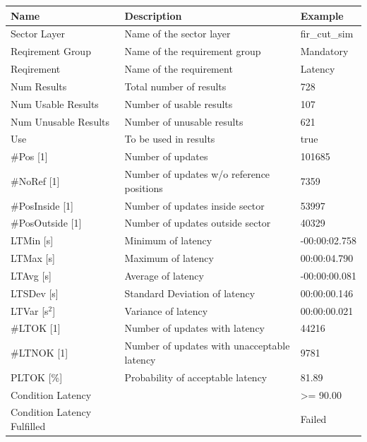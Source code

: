 \begin{center}
 \begin{table}[H]
  \begin{tabularx}{\textwidth}{ | l | X |  l | }
    \hline
    \textbf{Name} & \textbf{Description} & \textbf{Example} \\ \hline
    Sector Layer & Name of the sector layer & fir\_cut\_sim \\ \hline
    Reqirement Group & Name of the requirement group & Mandatory \\ \hline
    Reqirement & Name of the requirement & Latency \\ \hline
    Num Results & Total number of results & 728 \\ \hline
    Num Usable Results & Number of usable results & 107 \\ \hline
    Num Unusable Results & Number of unusable results & 621 \\ \hline
    Use & To be used in results & true \\ \hline
    \#Pos [1] & Number of updates & 101685 \\ \hline
    \#NoRef [1] & Number of updates w/o reference positions & 7359 \\ \hline
    \#PosInside [1] & Number of updates inside sector & 53997 \\ \hline
    \#PosOutside [1] & Number of updates outside sector & 40329 \\ \hline
    LTMin [s] & Minimum of latency & -00:00:02.758 \\ \hline
    LTMax [s] & Maximum of latency & 00:00:04.790 \\ \hline
    LTAvg [s] & Average of latency & -00:00:00.081 \\ \hline
    LTSDev [s] & Standard Deviation of latency & 00:00:00.146 \\ \hline
    LTVar [s$^2$] & Variance of latency & 00:00:00.021 \\ \hline
    \#LTOK [1] & Number of updates with latency & 44216 \\ \hline
    \#LTNOK [1] & Number of updates with unacceptable latency  & 9781 \\ \hline
    PLTOK [\%] & Probability of acceptable latency & 81.89 \\ \hline
    Condition Latency &  & >= 90.00 \\ \hline
    Condition Latency Fulfilled &  & Failed \\ \hline
\end{tabularx}
\end{table}
\end{center}

